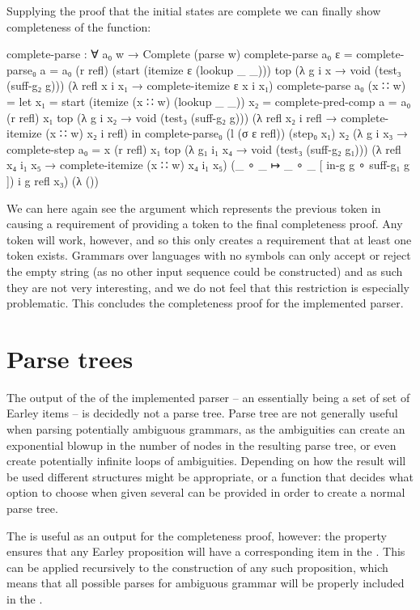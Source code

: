 		Supplying the proof that the initial states are complete we can finally
		show completeness of the  function:

		\begin{code}
			  complete-parse : ∀ a₀ w →
			    Complete (parse w)
			  complete-parse a₀ ε =
			    complete-parse₀ {a = a₀} (r refl) (start (itemize ε (lookup _ _))) top
			      (λ {g i x → void (test₃ (suff-g₂ g))})
			      (λ {refl x i x₁ → complete-itemize ε x i x₁})
			  complete-parse a₀ (x ∷ w) =
			    let
			      x₁ = start (itemize (x ∷ w) (lookup _ _)) 
			      x₂ = complete-pred-comp {a = a₀} (r refl) x₁ top
			        (λ {g i x₂ → void (test₃ (suff-g₂ g))})
			        (λ {refl x₂ i refl → complete-itemize (x ∷ w) x₂ i refl})
			    in
			    complete-parse₀ (l (σ ε refl)) (step₀ x₁) x₂
			      (λ g i x₃ → complete-step {a₀ = x} (r refl) x₁ top
			        (λ {g₁ i₁ x₄ → void (test₃ (suff-g₂ g₁))})
			        (λ {refl x₄ i₁ x₅ → complete-itemize (x ∷ w) x₄ i₁ x₅})
			        (_ ∘ _ ↦ _ ∘ _ [ in-g g ∘ suff-g₁ g ]) i g refl x₃)
			      (λ ())
		\end{code}

		We can here again see the argument  which represents the
		previous token in  causing a requirement of
		providing a token to the final completeness proof. Any token will work,
		however, and so this only creates a requirement that at least one token
		exists. Grammars over languages with no symbols can only accept or
		reject the empty string (as no other input sequence could be
		constructed) and as such they are not very interesting, and we do not
		feel that this restriction is especially problematic. This concludes
		the completeness proof for the implemented parser.

	\section{Parse trees}

		The output of the of the implemented parser -- an 
		essentially being a set of set of Earley items -- is decidedly not a
		parse tree.  Parse tree are not generally useful when parsing
		potentially ambiguous grammars, as the ambiguities can create an
		exponential blowup in the number of nodes in the resulting parse tree,
		or even create potentially infinite loops of ambiguities. Depending on
		how the result will be used different structures might be appropriate, 
		or a function that decides what option to choose when given several can 
		be provided in order to create a normal parse tree.

		The  is useful as an output for the completeness proof, 
		however: the  property ensures that any Earley 
		proposition will have a corresponding item in the . This
		can be applied recursively to the construction of any such proposition,
		which means that all possible parses for ambiguous grammar will be 
		properly included in the .
